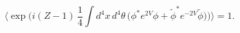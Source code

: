 \begin{equation}
\Big\langle \exp\Bigg(i (Z-1)\,
\frac{1}{4} \int d^4x\,d^4\theta\,\Big(\phi^* e^{2V}\phi
+ \tilde\phi^* e^{-2V}\tilde\phi\Big)\Bigg)\Big\rangle = 1.
\end{equation}

